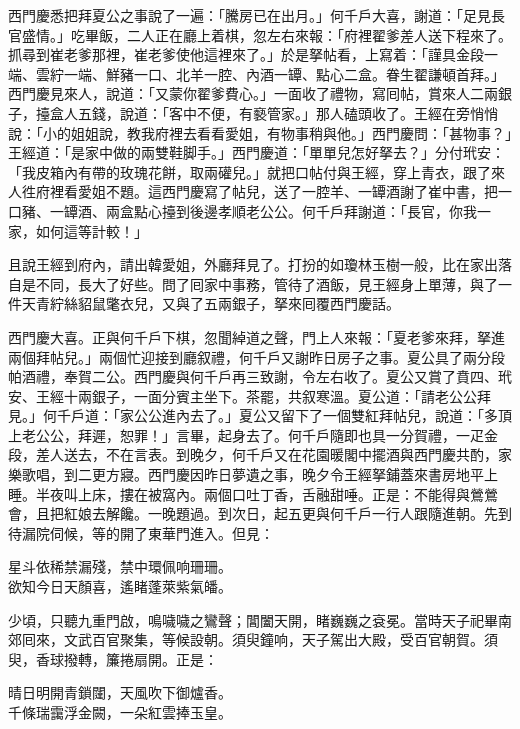 西門慶悉把拜夏公之事說了一遍：「騰房已在出月。」何千戶大喜，謝道：「足見長官盛情。」吃畢飯，二人正在廳上着棋，忽左右來報：「府裡翟爹差人送下程來了。抓尋到崔老爹那裡，崔老爹使他這裡來了。」{}於是拏帖看，上寫着：「謹具金段一端、雲紵一端、鮮豬一口、北羊一腔、內酒一罈、點心二盒。眷生翟謙頓首拜。」西門慶見來人，說道：「又蒙你翟爹費心。」一面收了禮物，寫囘帖，賞來人二兩銀子，擡盒人五錢，說道：「客中不便，有褻管家。」那人磕頭收了。王經在旁悄悄說：「小的姐姐說，教我府裡去看看愛姐，有物事稍與他。」西門慶問：「甚物事？」王經道：「是家中做的兩雙鞋脚手。」西門慶道：「單單兒怎好拏去？」分付玳安：「我皮箱內有帶的玫瑰花餅，取兩礶兒。」{}就把口帖付與王經，穿上青衣，跟了來人徃府裡看愛姐不題。這西門慶寫了帖兒，送了一腔羊、一罈酒謝了崔中書，把一口豬、一罈酒、兩盒點心擡到後邊孝順老公公。何千戶拜謝道：「長官，你我一家，如何這等計較！」

且說王經到府內，請出韓愛姐，外廳拜見了。打扮的如瓊林玉樹一般，比在家出落自是不同，長大了好些。問了囘家中事務，管待了酒飯，見王經身上單薄，與了一件天青紵絲貂鼠氅衣兒，又與了五兩銀子，拏來囘覆西門慶話。

西門慶大喜。正與何千戶下棋，忽聞綽道之聲，門上人來報：「夏老爹來拜，拏進兩個拜帖兒。」兩個忙迎接到廳叙禮，何千戶又謝昨日房子之事。夏公具了兩分段帕酒禮，奉賀二公。西門慶與何千戶再三致謝，令左右收了。夏公又賞了賁四、玳安、王經十兩銀子，一面分賓主坐下。茶罷，共叙寒溫。夏公道：「請老公公拜見。」何千戶道：「家公公進內去了。」夏公又留下了一個雙紅拜帖兒，說道：「多頂上老公公，拜遲，恕罪！」言畢，起身去了。何千戶隨即也具一分賀禮，一疋金段，差人送去，不在言表。到晚夕，何千戶又在花園暖閣中擺酒與西門慶共酌，家樂歌唱，到二更方寢。西門慶因昨日夢遺之事，晚夕令王經拏鋪蓋來書房地平上睡。半夜叫上床，摟在被窩內。{}兩個口吐丁香，舌融甜唾。正是：不能得與鶯鶯會，且把紅娘去解饞。一晚題過。到次日，起五更與何千戶一行人跟隨進朝。先到待漏院伺候，等的開了東華門進入。但見：

\begin{myquote}
星斗依稀禁漏殘，禁中環佩响珊珊。\\欲知今日天顏喜，遙睹蓬萊紫氣皤。
\end{myquote}

少頃，只聽九重門啟，鳴噦噦之鸞聲；閶闔天開，睹巍巍之袞冕。當時天子祀畢南郊囘來，文武百官聚集，等候設朝。須臾鐘响，天子駕出大殿，受百官朝賀。須臾，香球撥轉，簾捲扇開。正是：

\begin{myquote}
晴日明開青鎖闥，天風吹下御爐香。\\千條瑞靄浮金闕，一朵紅雲捧玉皇。
\end{myquote}

